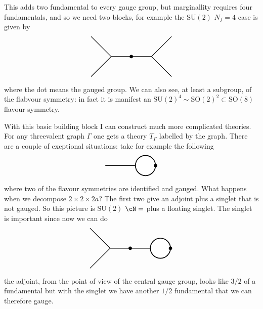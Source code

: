\documentclass[11pt]{article}
\theoremstyle{definition}
\numberwithin{equation}{section}
\newcommand*\SU{\mathrm{SU}}
\newcommand*\SO{\mathrm{SO}}
\begin{document}
This adds two fundamental to every gauge group, but marginallity requires four fundamentals, and so we need two blocks, for example the $\SU(2)$ $N_{f}=4$ case is given by
\begin{equation}
\begin{tikzpicture}[thick]
  \draw[-](0,0)--(1,-1);
  \draw[-](1,-1)--(0,-2);
  \draw[-](1,-1)--(2,-1);
  \draw[-](2,-1)--(3,-1);
  \draw[-](3,-1)--(4,0);
  \draw[-](3,-1)--(4,-2);
  \filldraw[black] (2,-1) circle (2pt) node[]{};
\end{tikzpicture}
\end{equation}
where the dot means the gauged group. We can also see, at least a subgroup, of the flabvour symmetry: in fact it is manifest an $\SU(2)^{4}\sim \SO(2)^{2}\subset \SO(8)$ flavour symmetry.

With this basic building block I can construct much more complicated theories. For any threevalent graph $\Gamma$ one gets a theory $T_{\Gamma}$ labelled by the graph. There are a couple of exeptional situations: take for example the following
\begin{equation}
\begin{tikzpicture}[thick]
	\draw[-](0,0)--(1.5,0);
	\filldraw[color=black, fill=white, very thick](2,0) circle (0.5);
 	\filldraw[black] (2.5,0) circle (2pt) node[]{};
\end{tikzpicture}
\label{eq:N4}
\end{equation}
where two of the flavour symmetries are identified and gauged. What happens when we decompose $2\times 2\times 2a$? The first two give an adjoint plus a singlet that is not gauged. So this picture is $\SU(2)$ $\cN=$ plus a floating singlet. The singlet is important since now we can do 
\begin{equation}
\begin{tikzpicture}[thick]
  \draw[-](0,0)--(1,-1);
  \draw[-](1,-1)--(0,-2);
  \draw[-](1,-1)--(2,-1);
  \draw[-](2,-1)--(3,-1);
  \filldraw[color=black, fill=white, very thick](3.5,-1) circle (0.5);
  \filldraw[black] (4,-1) circle (2pt) node[]{};
  \filldraw[black] (2,-1) circle (2pt) node[]{};
\end{tikzpicture}
\end{equation}
the adjoint, from the point of view of the central gauge group, looks like $3/2$ of a fundamental but with the singlet we have another $1/2$ fundamental that we can therefore gauge.
\end{document}
